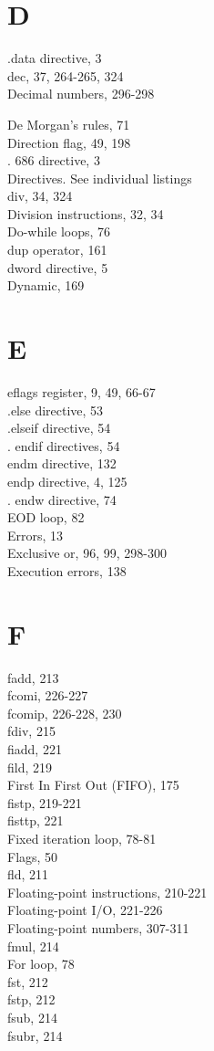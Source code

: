 \documentclass[10pt]{article}
\begin{document}
\section*{D}
.data directive, 3\\
dec, 37, 264-265, 324\\
Decimal numbers, 296-298

De Morgan's rules, 71\\
Direction flag, 49, 198\\
. 686 directive, 3\\
Directives. See individual listings\\
div, 34, 324\\
Division instructions, 32, 34\\
Do-while loops, 76\\
dup operator, 161\\
dword directive, 5\\
Dynamic, 169

\section*{E}
eflags register, 9, 49, 66-67\\
.else directive, 53\\
.elseif directive, 54\\
. endif directives, 54\\
endm directive, 132\\
endp directive, 4, 125\\
. endw directive, 74\\
EOD loop, 82\\
Errors, 13\\
Exclusive or, 96, 99, 298-300\\
Execution errors, 138

\section*{F}
fadd, 213\\
fcomi, 226-227\\
fcomip, 226-228, 230\\
fdiv, 215\\
fiadd, 221\\
fild, 219\\
First In First Out (FIFO), 175\\
fistp, 219-221\\
fisttp, 221\\
Fixed iteration loop, 78-81\\
Flags, 50\\
fld, 211\\
Floating-point instructions, 210-221\\
Floating-point I/O, 221-226\\
Floating-point numbers, 307-311\\
fmul, 214\\
For loop, 78\\
fst, 212\\
fstp, 212\\
fsub, 214\\
fsubr, 214
\end{document}
